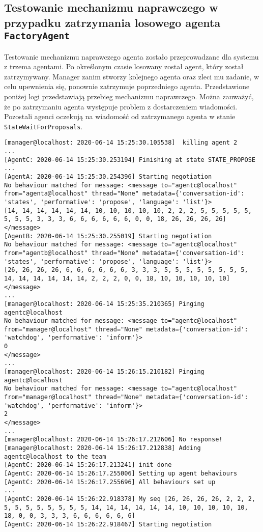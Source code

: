 \subsection{Testowanie mechanizmu naprawczego w przypadku zatrzymania losowego agenta \texttt{FactoryAgent}} \label{one-kill}
Testowanie mechanizmu naprawczego agenta zostało przeprowadzane dla systemu z trzema agentami. Po określonym czasie losowany został agent, który został zatrzymywany. Manager zanim stworzy kolejnego agenta oraz zleci mu zadanie, w celu upewnienia się, ponownie zatrzymuje poprzedniego agenta. Przedstawione poniżej logi przedstawiają przebieg mechanizmu naprawczego. Można zauważyć, że po zatrzymaniu agenta występuje problem z dostarczeniem wiadomości. Pozostali agenci oczekują na wiadomość od zatrzymanego agenta w stanie \texttt{StateWaitForProposals}.
\begin{lstlisting}
[manager@localhost: 2020-06-14 15:25:30.105538]  killing agent 2
...
[AgentC: 2020-06-14 15:25:30.253194] Finishing at state STATE_PROPOSE
...
[AgentA: 2020-06-14 15:25:30.254396] Starting negotiation
No behaviour matched for message: <message to="agentc@localhost" from="agenta@localhost" thread="None" metadata={'conversation-id': 'states', 'performative': 'propose', 'language': 'list'}>
[14, 14, 14, 14, 14, 14, 10, 10, 10, 10, 10, 2, 2, 2, 5, 5, 5, 5, 5, 5, 5, 5, 3, 3, 3, 6, 6, 6, 6, 6, 6, 0, 0, 18, 26, 26, 26, 26]
</message>
[AgentB: 2020-06-14 15:25:30.255019] Starting negotiation
No behaviour matched for message: <message to="agentc@localhost" from="agentb@localhost" thread="None" metadata={'conversation-id': 'states', 'performative': 'propose', 'language': 'list'}>
[26, 26, 26, 26, 6, 6, 6, 6, 6, 6, 3, 3, 3, 5, 5, 5, 5, 5, 5, 5, 5, 14, 14, 14, 14, 14, 14, 2, 2, 2, 0, 0, 18, 10, 10, 10, 10, 10]
</message>
...
[manager@localhost: 2020-06-14 15:25:35.210365] Pinging agentc@localhost
No behaviour matched for message: <message to="agentc@localhost" from="manager@localhost" thread="None" metadata={'conversation-id': 'watchdog', 'performative': 'inform'}>
0
</message>
...
[manager@localhost: 2020-06-14 15:26:15.210182] Pinging agentc@localhost
No behaviour matched for message: <message to="agentc@localhost" from="manager@localhost" thread="None" metadata={'conversation-id': 'watchdog', 'performative': 'inform'}>
2
</message>
...
[manager@localhost: 2020-06-14 15:26:17.212606] No response!
[manager@localhost: 2020-06-14 15:26:17.212838] Adding agentc@localhost to the team
[AgentC: 2020-06-14 15:26:17.213241] init done
[AgentC: 2020-06-14 15:26:17.255006] Setting up agent behaviours
[AgentC: 2020-06-14 15:26:17.255696] All behaviours set up
...
[AgentC: 2020-06-14 15:26:22.918378] My seq [26, 26, 26, 26, 2, 2, 2, 5, 5, 5, 5, 5, 5, 5, 5, 14, 14, 14, 14, 14, 14, 10, 10, 10, 10, 10, 18, 0, 0, 3, 3, 3, 6, 6, 6, 6, 6, 6]
[AgentC: 2020-06-14 15:26:22.918467] Starting negotiation
\end{lstlisting}
